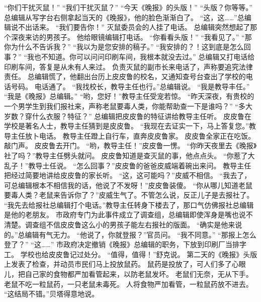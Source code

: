 \documentclass[a4paper,12pt,UTF8,twoside]{ctexbook}
\begin{document}
        “你们干扰灭鼠！” 
        “我们干扰灭鼠？” 
        “今天《晚报》的头版！” 
        “头版？你等等。” 
        总编辑从写字台右侧拿起当天的《晚报》，他的脸色渐渐白了。 
        “这，这……”总编辑说不出话来。 
        “我们要告你！” 
        灭鼠委员会的人挂了电话。 
        总编辑突然想起了那个深夜来访的男孩子。 
        他给眼镜编辑打电话。 
        “你看看头版！” 
        “我看见了。” 
        “那你为什么不告诉我？” 
        “我以为是您安排的稿子。” 
        “我安排的？！这到底是怎么回事？” 
        “我也不知道。你可以问问印刷车间，我根本就没去过。” 
        总编辑又打电话给印刷车间，答复是从未有人来过。 
        负责灭鼠的副市长来电话了，声称要追究法律责任。 
        总编辑慌了，他翻出台历上皮皮鲁的校名，又通知查号台查出了学校的电话号码。 
        电话通了。 
        “我找校长，教导主任也行。”总编辑说。 
        “我是教导丰任。” 
        “我是《晚报》总编辑。” 
        “哟，您好！”教导主任受宠若惊。 
        “昨天深夜，有贵校的一个男学生到我们报社来，声称老鼠要毒人类，你能帮助查一下是谁吗？” 
        “多大岁数？穿什么衣服？特征？” 
        总编辑把皮皮鲁的特征讲给教导主任听。 
        皮皮鲁在学校是著名人士，教导主任猜到是皮皮鲁。 
        “我现在去证实一下，马上答复您。”教导主任放卜电话。 
        教导主任蹬上自行车，直奔皮皮鲁家。 
        皮皮鲁全家正在吃饭。 
        敲门声。 
        皮皮鲁去开门。 
        “哟，教导主任！”皮皮鲁一愣。 
        “你昨天夜里去《晚报》社了吗？”教导主任劈头就问。 
        皮皮鲁知道是查灭鼠的事，他点点头。 
        “你惹了大乱子！”教导土任说。 
        “怎么回事？”皮皮鲁的爸爸皮威端着碗出来问。 
        教导主任把经过简要地讲给皮皮鲁的家长听。 
        “这，这可能吗？”皮威不相信。 
        “我去了，可总编辑根本不相信我的话，他说了不发呀！”皮皮鲁装傻。 
        “你从哪儿知道老鼠要毒人类？老鼠来告诉你了？”皮威生气了。不管怎么说，反正儿子是去报社了。 
        “我先去给报社总编辑打个电话。”教导主任转身下楼去了，那口气仿佛报社总编辑是他的老朋友。 
        市政府专门为此事件成立了调查组，总编辑即使浑身是嘴也说不清楚。调查组不信皮皮鲁这么小的男孩子能左右报社的版面。 
        “确实是他来说的。”总编辑有气无力。 
        “他说了，你就登报？”官员问。 
        “我不同意。” 
        “那报上怎么登了？” 
        “这……” 
        市政府决定撤销《晚报》总编辑的职务，下放到印刷厂当排字工。 
        学校也给皮皮鲁记过处分。 
        “值得，值得！”舒克说。 
        第二天的《晚报》头版上发表了检查，并动员市民们马上投放鼠药。 
        鼠药是投放了，可人们多了心眼儿，把自己家的食物都严加看管起来，以防老鼠发坏。 
        老鼠们无奈，无从下手。 
        老鼠不吃一粒鼠药，一只老鼠未毒死。 
        人将食物严加看管，一粒鼠药放不进去。 
        “这结局不错。”贝塔得意地说。 
\end{document}
